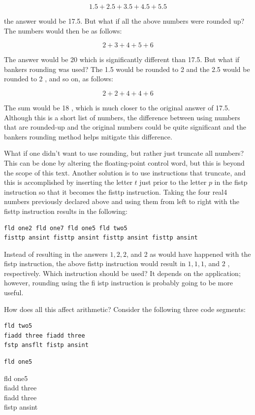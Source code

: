\documentclass[10pt]{article}
\begin{document}
$$
1.5+2.5+3.5+4.5+5.5
$$

the answer would be 17.5. But what if all the above numbers were rounded up? The numbers would then be as follows:

$$
2+3+4+5+6
$$

The answer would be 20 which is significantly different than 17.5. But what if bankers rounding was used? The 1.5 would be rounded to 2 and the 2.5 would be rounded to 2 , and so on, as follows:

$$
2+2+4+4+6
$$

The sum would be 18 , which is much closer to the original answer of 17.5. Although this is a short list of numbers, the difference between using numbers that are rounded-up and the original numbers could be quite significant and the bankers rounding method helps mitigate this difference.

What if one didn't want to use rounding, but rather just truncate all numbers? This can be done by altering the floating-point control word, but this is beyond the scope of this text. Another solution is to use instructions that truncate, and this is accomplished by inserting the letter $t$ just prior to the letter $p$ in the fistp instruction so that it becomes the fisttp instruction. Taking the four real4 numbers previously declared above and using them from left to right with the fisttp instruction results in the following:

\begin{verbatim}
fld one2 fld one7 fld one5 fld two5
fisttp ansint fisttp ansint fisttp ansint fisttp ansint
\end{verbatim}

Instead of resulting in the answers $1,2,2$, and 2 as would have happened with the fistp instruction, the above fisttp instruction would result in $1,1,1$, and 2 , respectively. Which instruction should be used? It depends on the application; however, rounding using the fi istp instruction is probably going to be more useful.

How does all this affect arithmetic? Consider the following three code segments:

\begin{verbatim}
fld two5
fiadd three fiadd three
fstp ansflt fistp ansint
\end{verbatim}

\begin{verbatim}
fld one5
\end{verbatim}

fld one5\\
fiadd three\\
fiadd three\\
fistp ansint
\end{document}
